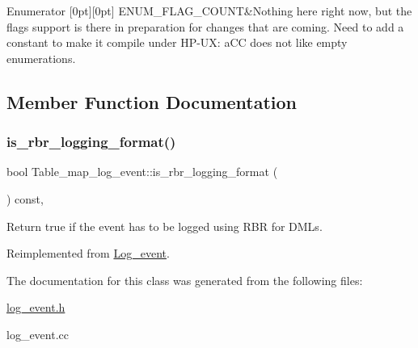 \begin{DoxyEnumFields}{Enumerator}
[0pt][0pt]{}\mbox{\label{classTable__map__log__event_a688364b7746acec26aab34fa3ac37cf7ae6cbf7133b45d85614a433043c50ec27}} 
E\+N\+U\+M\+\_\+\+F\+L\+A\+G\+\_\+\+C\+O\+U\+NT&Nothing here right now, but the flags support is there in preparation for changes that are coming. Need to add a constant to make it compile under HP-\/UX\+: a\+CC does not like empty enumerations. \\
\hline

\end{DoxyEnumFields}


\subsection{Member Function Documentation}
\mbox{\label{classTable__map__log__event_ab810d5c553584af2edf7fcaa3308fc77}} 
\subsubsection{\texorpdfstring{is\+\_\+rbr\+\_\+logging\+\_\+format()}{is\_rbr\_logging\_format()}}
{\footnotesize\ttfamily bool Table\+\_\+map\+\_\+log\+\_\+event\+::is\+\_\+rbr\+\_\+logging\+\_\+format (\begin{DoxyParamCaption}{ }\end{DoxyParamCaption}) const\hspace{0.3cm}{\ttfamily [inline]}, {\ttfamily [virtual]}}

Return true if the event has to be logged using R\+BR for D\+M\+Ls. 

Reimplemented from \mbox{\hyperlink{classLog__event_abd996ad9f33a59c3b03737beb2c2869d}{Log\+\_\+event}}.



The documentation for this class was generated from the following files\+:\begin{DoxyCompactItemize}
\item 
\mbox{\hyperlink{log__event_8h}{log\+\_\+event.\+h}}\item 
log\+\_\+event.\+cc\end{DoxyCompactItemize}
